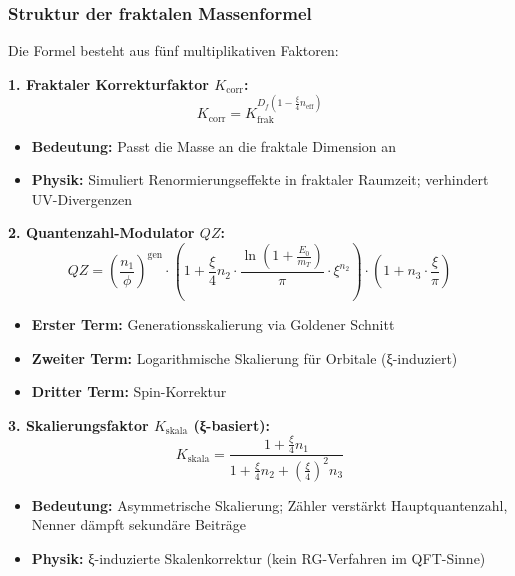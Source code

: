 	\subsubsection{Struktur der fraktalen Massenformel}
	
	Die Formel besteht aus fünf multiplikativen Faktoren:
	
	\textbf{1. Fraktaler Korrekturfaktor $K_{\text{corr}}$:}
	\begin{equation}
		K_{\text{corr}} = K_{\text{frak}}^{D_f \left(1 - \frac{\xi}{4} n_{\text{eff}}\right)}
	\end{equation}
	\begin{itemize}
		\item \textbf{Bedeutung:} Passt die Masse an die fraktale Dimension an
		\item \textbf{Physik:} Simuliert Renormierungseffekte in fraktaler Raumzeit; verhindert UV-Divergenzen
	\end{itemize}
	
	\textbf{2. Quantenzahl-Modulator $QZ$:}
	\begin{equation}
		QZ = \left( \frac{n_1}{\phi} \right)^{\text{gen}} \cdot \left(1 + \frac{\xi}{4} n_2 \cdot \frac{\ln\left(1 + \frac{E_0}{m_T}\right)}{\pi} \cdot \xi^{n_2}\right) \cdot \left(1 + n_3 \cdot \frac{\xi}{\pi}\right)
	\end{equation}
	\begin{itemize}
		\item \textbf{Erster Term:} Generationsskalierung via Goldener Schnitt
		\item \textbf{Zweiter Term:} Logarithmische Skalierung für Orbitale (ξ-induziert)
		\item \textbf{Dritter Term:} Spin-Korrektur
	\end{itemize}
	
	\textbf{3. Skalierungsfaktor $K_{\text{skala}}$ (ξ-basiert):}
	\begin{equation}
		K_{\text{skala}} = \frac{1 + \frac{\xi}{4} n_1}{1 + \frac{\xi}{4} n_2 + \left(\frac{\xi}{4}\right)^2 n_3}
	\end{equation}
	\begin{itemize}
		\item \textbf{Bedeutung:} Asymmetrische Skalierung; Zähler verstärkt Hauptquantenzahl, Nenner dämpft sekundäre Beiträge
		\item \textbf{Physik:} ξ-induzierte Skalenkorrektur (kein RG-Verfahren im QFT-Sinne)
	\end{itemize}
	
